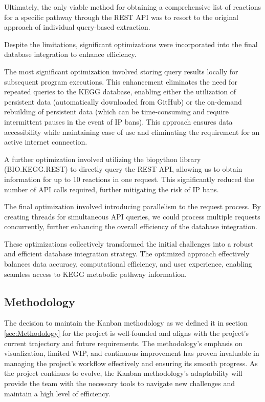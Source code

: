 \documentclass[12pt]{article}
\begin{document}
Ultimately, the only viable method for obtaining a comprehensive list of reactions for a specific pathway through the REST API was to resort to the original approach of individual query-based extraction.

Despite the limitations, significant optimizations were incorporated into the final database integration to enhance efficiency.

The most significant optimization involved storing query results locally for subsequent program executions. This enhancement eliminates the need for repeated queries to the KEGG database, enabling either the utilization of persistent data (automatically downloaded from GitHub) or the on-demand rebuilding of persistent data (which can be time-consuming and require intermittent pauses in the event of IP bans). This approach ensures data accessibility while maintaining ease of use and eliminating the requirement for an active internet connection.

A further optimization involved utilizing the biopython library (BIO.KEGG.REST) to directly query the REST API, allowing us to obtain information for up to 10 reactions in one request. This significantly reduced the number of API calls required, further mitigating the risk of IP bans.

The final optimization involved introducing parallelism to the request process. By creating threads for simultaneous API queries, we could process multiple requests concurrently, further enhancing the overall efficiency of the database integration.

These optimizations collectively transformed the initial challenges into a robust and efficient database integration strategy. The optimized approach effectively balances data accuracy, computational efficiency, and user experience, enabling seamless access to KEGG metabolic pathway information.

\subsection{Methodology}

The decision to maintain the Kanban methodology as we defined it in section \ref{sec:Methodology} for the project is well-founded and aligns with the project's current trajectory and future requirements. The methodology's emphasis on visualization, limited WIP, and continuous improvement has proven invaluable in managing the project's workflow effectively and ensuring its smooth progress. As the project continues to evolve, the Kanban methodology's adaptability will provide the team with the necessary tools to navigate new challenges and maintain a high level of efficiency.
\end{document}
